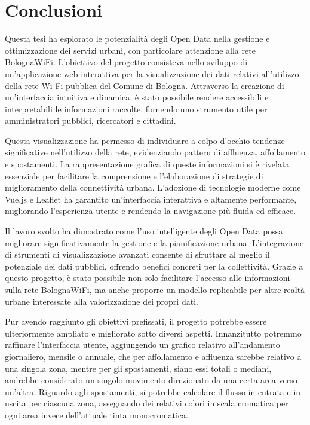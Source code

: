 \clearpage{\pagestyle{empty}\cleardoublepage}

\chapter*{Conclusioni}



Questa tesi ha esplorato le potenzialità degli Open Data nella gestione e ottimizzazione dei servizi urbani, con particolare attenzione alla rete BolognaWiFi. L'obiettivo del progetto consisteva nello sviluppo di un'applicazione web interattiva per la visualizzazione dei dati relativi all'utilizzo della rete Wi-Fi pubblica del Comune di Bologna. Attraverso la creazione di un'interfaccia intuitiva e dinamica, è stato possibile rendere accessibili e interpretabili le informazioni raccolte, fornendo uno strumento utile per amministratori pubblici, ricercatori e cittadini.

Questa visualizzazione ha permesso di individuare a colpo d'occhio tendenze significative nell'utilizzo della rete, evidenziando pattern di affluenza, affollamento e spostamenti. La rappresentazione grafica di queste informazioni si è rivelata essenziale per facilitare la comprensione e l'elaborazione di strategie di miglioramento della connettività urbana. L'adozione di tecnologie moderne come Vue.js e Leaflet ha garantito un'interfaccia interattiva e altamente performante, migliorando l'esperienza utente e rendendo la navigazione più fluida ed efficace.

Il lavoro svolto ha dimostrato come l'uso intelligente degli Open Data possa migliorare significativamente la gestione e la pianificazione urbana. L'integrazione di strumenti di visualizzazione avanzati consente di sfruttare al meglio il potenziale dei dati pubblici, offrendo benefici concreti per la collettività. Grazie a questo progetto, è stato possibile non solo facilitare l'accesso alle informazioni sulla rete BolognaWiFi, ma anche proporre un modello replicabile per altre realtà urbane interessate alla valorizzazione dei propri dati.

Pur avendo raggiunto gli obiettivi prefissati, il progetto potrebbe essere ulteriormente ampliato e migliorato sotto diversi aspetti. Innanzitutto potremmo raffinare l'interfaccia utente, aggiungendo un grafico relativo all'andamento giornaliero, mensile o annuale, che per affollamento e affluenza sarebbe relativo a una singola zona, mentre per gli spostamenti, siano essi totali o mediani, andrebbe considerato un singolo movimento direzionato da una certa area verso un'altra. Riguardo agli spostamenti, si potrebbe calcolare il flusso in entrata e in uscita per ciascuna zona, assegnando dei relativi colori in scala cromatica per ogni area invece dell'attuale tinta monocromatica.

